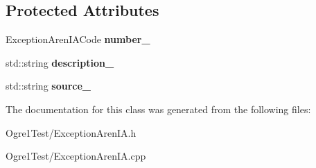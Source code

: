 \subsection*{Protected Attributes}
\begin{DoxyCompactItemize}
\item 
Exception\+Aren\+I\+A\+Code {\bfseries number\+\_\+}\hypertarget{class_exception_aren_i_a_a43882a30941d28242ddb46f902bb96dd}{}\label{class_exception_aren_i_a_a43882a30941d28242ddb46f902bb96dd}

\item 
std\+::string {\bfseries description\+\_\+}\hypertarget{class_exception_aren_i_a_a923b166ce7c301bb8bc6aed05dfd8e76}{}\label{class_exception_aren_i_a_a923b166ce7c301bb8bc6aed05dfd8e76}

\item 
std\+::string {\bfseries source\+\_\+}\hypertarget{class_exception_aren_i_a_a1b1c2b52ead1cb67891157667e96cddc}{}\label{class_exception_aren_i_a_a1b1c2b52ead1cb67891157667e96cddc}

\end{DoxyCompactItemize}


The documentation for this class was generated from the following files\+:\begin{DoxyCompactItemize}
\item 
Ogre1\+Test/Exception\+Aren\+I\+A.\+h\item 
Ogre1\+Test/Exception\+Aren\+I\+A.\+cpp\end{DoxyCompactItemize}
